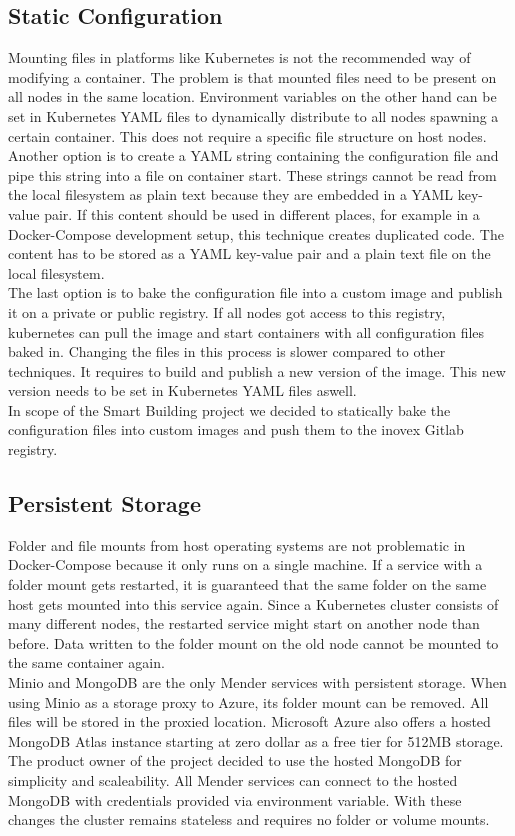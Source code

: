 \subsection{Static Configuration}
Mounting files in platforms like Kubernetes is not the recommended way of modifying a container. The problem is that mounted files need to be present on all nodes in the same location. Environment variables on the other hand can be set in Kubernetes YAML files to dynamically distribute to all nodes spawning a certain container. This does not require a specific file structure on host nodes.\\
Another option is to create a YAML string containing the configuration file and pipe this string into a file on container start. These strings cannot be read from the local filesystem as plain text because they are embedded in a YAML key-value pair. If this content should be used in different places, for example in a Docker-Compose development setup, this technique creates duplicated code. The content has to be stored as a YAML key-value pair and a plain text file on the local filesystem.\\
The last option is to bake the configuration file into a custom image and publish it on a private or public registry. If all nodes got access to this registry, kubernetes can pull the image and start containers with all configuration files baked in. Changing the files in this process is slower compared to other techniques. It requires to build and publish a new version of the image. This new version needs to be set in Kubernetes YAML files aswell.\\
In scope of the Smart Building project we decided to statically bake the configuration files into custom images and push them to the inovex Gitlab registry.

\subsection{Persistent Storage}
Folder and file mounts from host operating systems are not problematic in Docker-Compose because it only runs on a single machine. If a service with a folder mount gets restarted, it is guaranteed that the same folder on the same host gets mounted into this service again. Since a Kubernetes cluster consists of many different nodes, the restarted service might start on another node than before. Data written to the folder mount on the old node cannot be mounted to the same container again.\\
Minio and MongoDB are the only Mender services with persistent storage. When using Minio as a storage proxy to Azure, its folder mount can be removed. All files will be stored in the proxied location. Microsoft Azure also offers a hosted MongoDB Atlas instance starting at zero dollar as a free tier for 512MB storage.\cite{azuremongodbatlas} The product owner of the project decided to use the hosted MongoDB for simplicity and scaleability. All Mender services can connect to the hosted MongoDB with credentials provided via environment variable. With these changes the cluster remains stateless and requires no folder or volume mounts.

